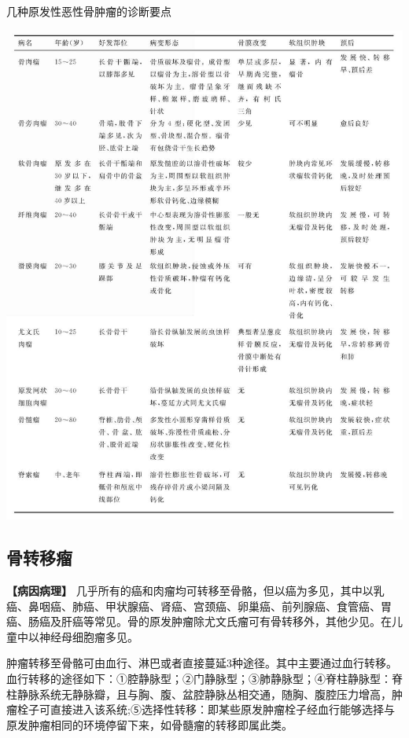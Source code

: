 \begin{table}[htbp]
\centering
\caption{几种原发性恶性骨肿瘤的诊断要点}
\label{tab22-4}
\includegraphics[width=\textwidth,height=\textheight,keepaspectratio]{./images/Image00445.jpg}
\end{table}

\subsection{骨转移瘤}

\textbf{【病因病理】}
几乎所有的癌和肉瘤均可转移至骨骼，但以癌为多见，其中以乳癌、鼻咽癌、肺癌、甲状腺癌、肾癌、宫颈癌、卵巢癌、前列腺癌、食管癌、胃癌、肠癌及肝癌等常见。骨的原发肿瘤除尤文氏瘤可有骨转移外，其他少见。在儿童中以神经母细胞瘤多见。

肿瘤转移至骨骼可由血行、淋巴或者直接蔓延3种途径。其中主要通过血行转移。血行转移的途径如下：①腔静脉型；②门静脉型；③肺静脉型；④脊柱静脉型：脊柱静脉系统无静脉瓣，且与胸、腹、盆腔静脉丛相交通，随胸、腹腔压力增高，肿瘤栓子可直接进入该系统;⑤选择性转移：即某些原发肿瘤栓子经血行能够选择与原发肿瘤相同的环境停留下来，如骨髓瘤的转移即属此类。

